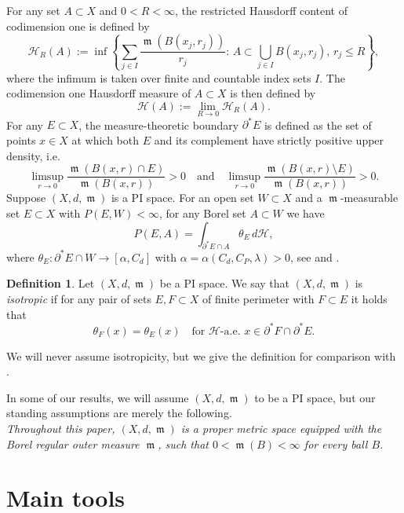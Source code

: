 \documentclass[11pt]{article}
\numberwithin{equation}{section}
\theoremstyle{plain}
\theoremstyle{definition}
\newtheorem{definition}[equation]{Definition}
\numberwithin{equation}{section}
\DeclareMathOperator{\frm}{\mathfrak{m}}
\begin{document}
For any set $A\subset X$ and $0<R<\infty$, the restricted Hausdorff content
of codimension one is defined by
\[
\mathcal{H}_{R}(A):=\inf\left\{ \sum_{j\in I}
\frac{\frm(B(x_{j},r_{j}))}{r_{j}}:\,A\subset\bigcup_{j\in I}B(x_{j},r_{j}),\,r_{j}\le R\right\},
\]
where the infimum is taken over finite and countable index sets $I$.
The codimension one Hausdorff measure of $A\subset X$ is then defined by
\[
\mathcal{H}(A):=\lim_{R\rightarrow 0}\mathcal{H}_{R}(A).
\]
For any $E\subset X$, the measure-theoretic boundary $\partial^{*}E$ is defined
as the set of points $x\in X$
at which both $E$ and its complement have strictly positive upper density, i.e.
\[
\limsup_{r\to 0}\frac{\frm(B(x,r)\cap E)}{\frm(B(x,r))}>0\quad
\textrm{and}\quad\limsup_{r\to 0}\frac{\frm(B(x,r)\setminus E)}{\frm(B(x,r))}>0.
\]
Suppose $(X,d,\frm)$ is a PI space.
For an open set $W\subset X$ and a $\frm$-measurable set $E\subset X$ with $P(E,W)<\infty$,
 for any Borel set $A\subset W$ we have
\begin{equation}\label{eq:def of theta}
P(E,A)=\int_{\partial^{*}E\cap A}\theta_E\,d\mathcal H,
\end{equation}
where
$\theta_E\colon \partial^*E\cap W\to [\alpha,C_d]$
with $\alpha=\alpha(C_d,C_P,\lambda)>0$, see \cite[Theorem 5.3]{A1} 
and \cite[Theorem 4.6]{AMP}.

\begin{definition}\label{def:isotropicity}
Let $(X,d,\frm)$ be a PI space. We say that $(X,d,\frm)$ is \emph{isotropic} if for
any pair of sets $E,F\subset X$ of finite perimeter with $F\subset E$
it holds that
\[
\theta_F(x) = \theta_E(x)\quad \textrm{for }\mathcal H\textrm{-a.e. }x\in \partial^*F\cap\partial^*E.
\]
\end{definition}

We will never assume isotropicity, but we give the definition for comparison with \cite{BPR}.

In some of our results, we will assume $(X,d,\frm)$ to be a PI space,
but our standing assumptions are merely the following.\\

\emph{Throughout this paper, $(X,d,\frm)$ is a proper metric space equipped with the
	Borel regular outer measure $\frm$, such that $0<\frm(B)<\infty$ for every ball $B$.}

\section{Main tools}\label{sec:main tools}
\end{document}
